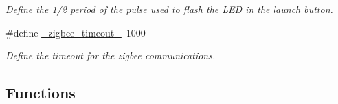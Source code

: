 \begin{DoxyCompactItemize}
\begin{DoxyCompactList}\small\item\em \-Define the 1/2 period of the pulse used to flash the \-L\-E\-D in the launch button. \end{DoxyCompactList}\item 
\#define \hyperlink{launchPad_8ino_a6b982ea9a4c912acbfd98bbd5072e258}{\-\_\-zigbee\-\_\-timeout\-\_\-}~1000
\begin{DoxyCompactList}\small\item\em \-Define the timeout for the zigbee communications. \end{DoxyCompactList}\end{DoxyCompactItemize}
\subsection*{\-Functions}
